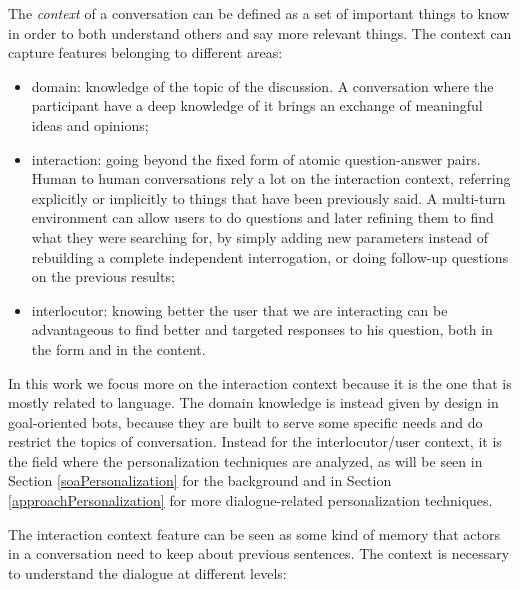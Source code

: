 The \textit{context} of a conversation can be defined as a set of important things to know in order to both understand others and say more relevant things. The context can capture features belonging to different areas:

\begin{itemize}
	\item domain: knowledge of the topic of the discussion. A conversation where the participant have a deep knowledge of it brings an exchange of meaningful ideas and opinions;

	\item interaction: going beyond the fixed form of atomic question-answer pairs. Human to human conversations rely a lot on the interaction context, referring explicitly or implicitly to things that have been previously said. A multi-turn environment can allow users to do questions and later refining them to find what they were searching for, by simply adding new parameters instead of rebuilding a complete independent interrogation, or doing follow-up questions on the previous results;

	\item interlocutor: knowing better the user that we are interacting can be advantageous to find better and targeted responses to his question, both in the form and in the content.
\end{itemize}

In this work we focus more on the interaction context because it is the one that is mostly related to language. The domain knowledge is instead given by design in goal-oriented bots, because they are built to serve some specific needs and do restrict the topics of conversation. Instead for the interlocutor/user context, it is the field where the personalization techniques are analyzed, as will be seen in Section \ref{soaPersonalization} for the background and in Section \ref{approachPersonalization} for more dialogue-related personalization techniques.

The interaction context feature can be seen as some kind of memory that actors in a conversation need to keep about previous sentences. The context is necessary to understand the dialogue at different levels:

